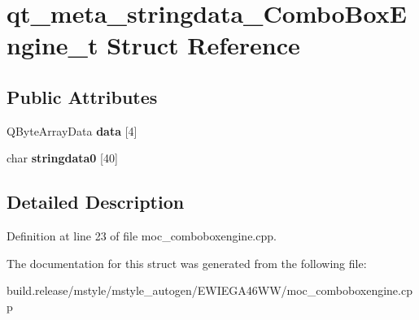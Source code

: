 \hypertarget{structqt__meta__stringdata___combo_box_engine__t}{}\section{qt\+\_\+meta\+\_\+stringdata\+\_\+\+Combo\+Box\+Engine\+\_\+t Struct Reference}
\label{structqt__meta__stringdata___combo_box_engine__t}
\subsection*{Public Attributes}
\begin{DoxyCompactItemize}
\item 
\mbox{\label{structqt__meta__stringdata___combo_box_engine__t_ab57e6d504f1055f1c4a2e4e89b5d2e4f}} 
Q\+Byte\+Array\+Data {\bfseries data} \mbox{[}4\mbox{]}
\item 
\mbox{\label{structqt__meta__stringdata___combo_box_engine__t_a02a2afe585222fafdcf04d1a8457face}} 
char {\bfseries stringdata0} \mbox{[}40\mbox{]}
\end{DoxyCompactItemize}


\subsection{Detailed Description}


Definition at line 23 of file moc\+\_\+comboboxengine.\+cpp.



The documentation for this struct was generated from the following file\+:\begin{DoxyCompactItemize}
\item 
build.\+release/mstyle/mstyle\+\_\+autogen/\+E\+W\+I\+E\+G\+A46\+W\+W/moc\+\_\+comboboxengine.\+cpp\end{DoxyCompactItemize}
